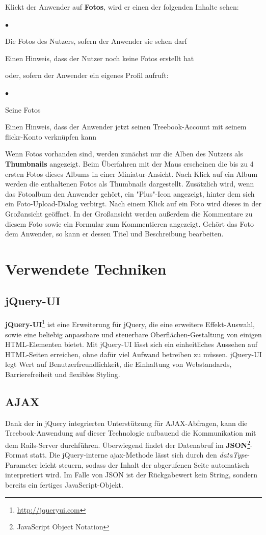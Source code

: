 \documentclass[10pt,a4paper]{book}
\begin{document}
Klickt der Anwender auf \textbf{Fotos}, wird er einen der folgenden Inhalte sehen:
\begin{list}{$\bullet$}{}
\item Die Fotos des Nutzers, sofern der Anwender sie sehen darf
\item Einen Hinweis, dass der Nutzer noch keine Fotos erstellt hat
\end{list}
oder, sofern der Anwender ein eigenes Profil aufruft:
\begin{list}{$\bullet$}{}
\item Seine Fotos
\item Einen Hinweis, dass der Anwender jetzt seinen Treebook-Account mit seinem flickr-Konto verknüpfen kann
\end{list}
Wenn Fotos vorhanden sind, werden zunächst nur die Alben des Nutzers als \textbf{Thumbnails} angezeigt. Beim Überfahren mit der Maus erscheinen die bis zu 4 ersten Fotos dieses Albums in einer Miniatur-Ansicht.
Nach Klick auf ein Album werden die enthaltenen Fotos als Thumbnails dargestellt. Zusätzlich wird, wenn das Fotoalbum den Anwender gehört, ein "Plus"-Icon angezeigt, hinter dem sich ein Foto-Upload-Dialog verbirgt.
Nach einem Klick auf ein Foto wird dieses in der Großansicht geöffnet.
In der Großansicht werden außerdem die Kommentare zu diesem Foto sowie ein Formular zum Kommentieren angezeigt. Gehört das Foto dem Anwender, so kann er dessen Titel und Beschreibung bearbeiten.
\section{Verwendete Techniken}
\subsection{jQuery-UI}
\textbf{jQuery-UI}\footnote{\href{http://jqueryui.com}{http://jqueryui.com}} ist eine Erweiterung für jQuery, die eine erweitere Effekt-Auswahl, sowie eine beliebig anpassbare und steuerbare Oberflächen-Gestaltung von einigen HTML-Elementen bietet.
Mit jQuery-UI lässt sich ein einheitliches Aussehen auf HTML-Seiten erreichen, ohne dafür viel Aufwand betreiben zu müssen. jQuery-UI legt Wert auf Benutzerfreundlichkeit, die Einhaltung von Webstandards, Barrierefreiheit und flexibles Styling.

\subsection{AJAX}
Dank der in jQuery integrierten Unterstützung für AJAX-Abfragen, kann die Treebook-Anwendung auf dieser Technologie aufbauend die Kommunikation mit dem Rails-Server durchführen.
Überwiegend findet der Datenabruf im \textbf{JSON}\footnote{JavaScript Object Notation}-Format statt. Die jQuery-interne ajax-Methode lässt sich durch den \textit{dataType}-Parameter leicht steuern, sodass der Inhalt der abgerufenen Seite automatisch interpretiert wird. Im Falle von JSON ist der Rückgabewert kein String, sondern bereits ein fertiges JavaScript-Objekt.
\end{document}
